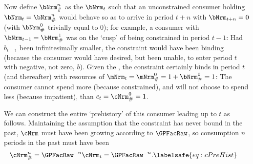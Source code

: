 \documentclass[\econtexRoot/BufferStockTheory]{subfiles}
\begin{document}
Now define $\bNrm_{\#}^{n}$ as the $\bNrm_{t}$ such that an unconstrained consumer holding $\bNrm_{t}=\bNrm_{\#}^{n}$ would behave so as to arrive in period $t+n$ with $\bNrm_{t+n}=0$ (with $\bNrm_{\#}^{0}$ trivially equal to 0); for example, a consumer with $\bNrm_{t-1}=\bNrm_{\#}^{1}$ was on the `cusp' of being constrained in period $t-1$: Had $b_{t-1}$ been infinitesimally smaller, the constraint would have been binding (because the consumer would have desired, but been unable, to enter period $t$ with negative, not zero, $b$).
Given
the \GICRaw, the constraint certainly binds in period $t$ (and thereafter) with resources of $\mNrm_{t}=\mNrm_{\#}^{0}=1+\bNrm_{\#}^{0}=1$: The consumer cannot spend more (because constrained), and will not choose to spend less (because impatient), than $c_{t}=\cNrm_{\#}^{0}=1$.

We can construct the entire `prehistory' of this consumer leading up to $t$ as follows.
Maintaining the assumption that the constraint has never bound in the past,
$\cNrm$ must have been growing according to $\GPFacRaw$, so consumption $n$ periods in the past must have been
\begin{equation}\begin{gathered}\begin{aligned}
  \cNrm_{\#}^{n}  & = \GPFacRaw^{-n} \cNrm_{t} = \GPFacRaw^{-n}. \labelsafe{eq:cPreHist}
\end{aligned}\end{gathered}\end{equation}
\end{document}
